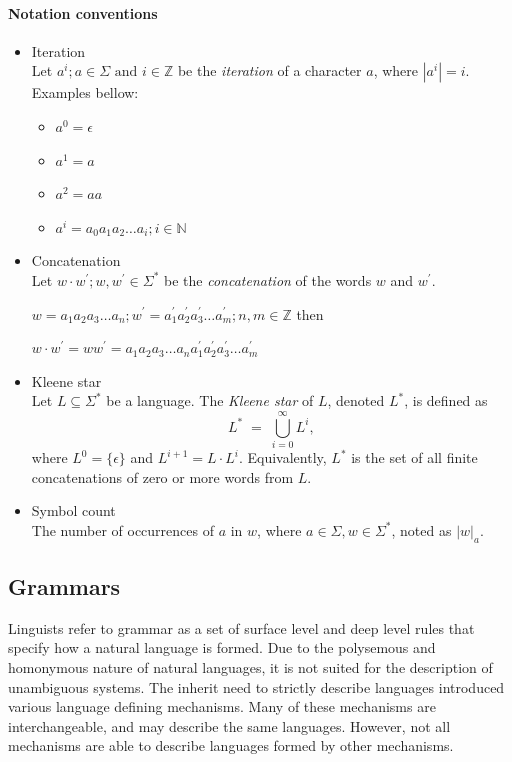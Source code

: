 \paragraph*{Notation conventions}



\begin{itemize}
\item Iteration\\
  Let $a^i; a \in \Sigma \text{ and } i \in \mathbb{Z}$ be the \emph{iteration} of a character $a$, where $|a^i| = i$.\\
Examples bellow:


\begin{itemize}
\item $a^0 = \epsilon$
\item $a^1 = a$
\item $a^2 = aa$
\item $a^i = a_0 a_1 a_2 \dots a_i; i \in \mathbb{N}$
\end{itemize}


\item Concatenation\\
  Let $w \cdot w^{'}; w, w^{'} \in \Sigma^{*}$ be the \emph{concatenation} of the words $w$ and $w^{'}$.

$w = a_1 a_2 a_3 \dots a_n ; w^{'} = a^{'}_1 a^{'}_2 a^{'}_3 \dots a^{'}_m; n,m \in \mathbb{Z}$ then  

$w\cdot w^{'} = w w^{'} = a_1 a_2 a_3 \dots a_n a^{'}_1 a^{'}_2 a^{'}_3 \dots a^{'}_m$


\item Kleene star\\
  Let $L \subseteq \Sigma^{*}$ be a language. The \emph{Kleene star} of $L$, denoted $L^{*}$, is defined as
  \[
    L^{*} \;=\; \bigcup_{i=0}^{\infty} L^{i},
  \]
  where $L^{0} = \{\epsilon\}$ and $L^{i+1} = L \cdot L^{i}$.  Equivalently, $L^{*}$ is the set of all finite concatenations of zero or more words from $L$.\\

\item Symbol count\\
The number of occurrences of $a$ in $w$, where $a \in \Sigma, w \in \Sigma^{*}$, noted as $|w|_{a}$.

\end{itemize}

\subsection{Grammars}
Linguists refer to grammar as a set of surface level and deep level rules that specify how a natural language is formed. Due to the polysemous and homonymous nature of natural languages, it is not suited for the description of unambiguous systems. The inherit need to strictly describe languages introduced various language defining mechanisms. Many of these mechanisms are interchangeable, and may describe the same languages. However, not all mechanisms are able to describe languages formed by other mechanisms.

